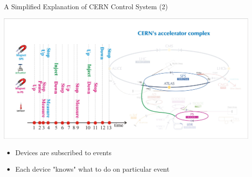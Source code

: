 \documentclass[compress,red]{beamer}
\begin{document}
\begin{frame}{A Simplified Explanation of CERN Control System (2)}

      \begin{center}
      \includegraphics[width=1.0\textwidth]{applications/CERN/event2.pdf}
      \end{center}

  \begin{itemize}
    \item Devices are subscribed to events 
    \item Each device "knows" what to do on particular event
  \end{itemize}


\end{frame}
\end{document}
